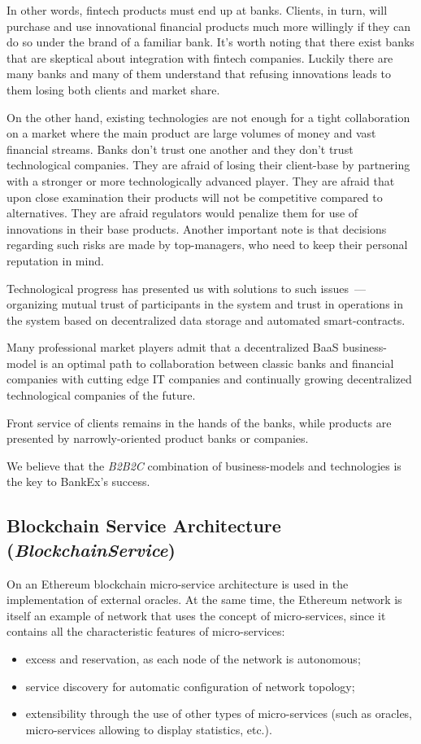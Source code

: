 \documentclass{article}
\begin{document}
\begin{multicols}{2}
In other words, fintech products must end up at banks. Clients, in turn, will purchase and use innovational financial products much more willingly if they can do so under the brand of a familiar bank. It’s worth noting that there exist banks that are skeptical about integration with fintech companies. Luckily there are many banks and many of them understand that refusing innovations leads to them losing both clients and market share.

On the other hand, existing technologies are not enough for a tight collaboration on a market where the main product are large volumes of money and vast financial streams. Banks don’t trust one another and they don’t trust technological companies. They are afraid of losing their client-base by partnering with a stronger or more technologically advanced player. They are afraid that upon close examination their products will not be competitive compared to alternatives. They are afraid regulators would penalize them for use of innovations in their base products. Another important note is that decisions regarding such risks are made by top-managers, who need to keep their personal reputation in mind.

Technological progress has presented us with solutions to such issues~--- organizing mutual trust of participants in the system and trust in operations in the system based on decentralized data storage and automated smart-contracts.

Many professional market players admit that a decentralized BaaS business-model is an optimal path to collaboration between classic banks and financial companies with cutting edge IT companies and continually growing decentralized technological companies of the future.

Front service of clients remains in the hands of the banks, while products are presented by narrowly-oriented product banks or companies.

We believe that the \textit{B2B2C} combination of business-models and technologies is the key to BankEx’s success.

\subsection{Blockchain Serviсe Architecture (\textit{BlockchainService})}

On an Ethereum blockchain micro-service architecture is used in the implementation of external oracles. At the same time, the Ethereum network is itself an example of network that uses the concept of micro-services, since it contains all the characteristic features of micro-services:
\begin{itemize}
\item excess and reservation, as each node of the network is autonomous;
\item service discovery for automatic configuration of network topology;
\item extensibility through the use of other types of micro-services (such as oracles, micro-services allowing to display statistics, etc.). 
\end{itemize}


\end{multicols}
\end{document}
